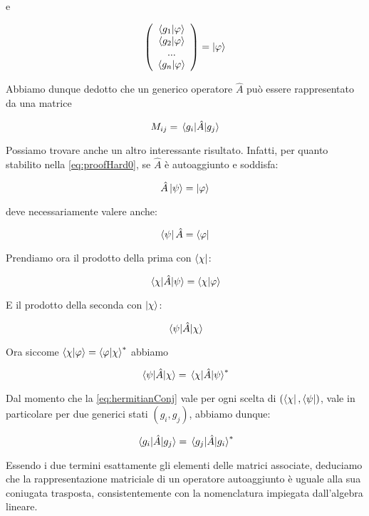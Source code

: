 e

	\begin{equation}
		\left ( \begin{array}{c}
				\braket{g_1}{\varphi} \\
				\braket{g_2}{\varphi} \\
				... \\
				\braket{g_n}{\varphi} \\
			\end{array}
		\right ) = \ket{\varphi}
	\end{equation}

Abbiamo dunque dedotto che un generico operatore $\hat{A}$ può essere rappresentato da una matrice

	\begin{equation} \label{eq:matricialFormOperator}
		M_{ij} = \mel{g_i}{\hat{A}}{g_j} 
	\end{equation}

	Possiamo trovare anche un altro interessante risultato. Infatti, per quanto stabilito nella \eqref{eq:proofHard0}, se $\hat{A}$ è autoaggiunto e soddisfa:
	
	\[
		\hat{A} \ket{\psi} = \ket{\varphi}
	\]
	
deve necessariamente valere anche:

	\[
		\bra{\psi} \hat{A} = \bra{\varphi}
	\]

Prendiamo ora il prodotto della prima con $\bra{\chi}$:

	\begin{equation}
		\mel{\chi}{\hat{A}}{\psi} = \braket{\chi}{\varphi}
	\end{equation}

E il prodotto della seconda con $\ket{\chi}$:

	\begin{equation}
		\mel{\psi}{\hat{A}}{\chi}
	\end{equation}

Ora siccome $\braket{\chi}{\varphi} = \braket{\varphi}{\chi}^*$ abbiamo

	\begin{equation} \label{eq:hermitianConj}
		\mel{\psi}{\hat{A}}{\chi} = \mel{\chi}{\hat{A}}{\psi}^*
	\end{equation}

	Dal momento che la \eqref{eq:hermitianConj} vale per ogni scelta di $(\bra{\chi}, \bra{\psi})$, vale in particolare per due generici stati $(g_i, g_j)$, abbiamo dunque:

	\begin{equation}
		\mel{g_i}{\hat{A}}{g_j} = \mel{g_j}{\hat{A}}{g_i}^*
	\end{equation}

Essendo i due termini esattamente gli elementi delle matrici associate, deduciamo che la rappresentazione matriciale di un operatore autoaggiunto è uguale alla sua coniugata trasposta, consistentemente con la nomenclatura impiegata dall'algebra lineare.
